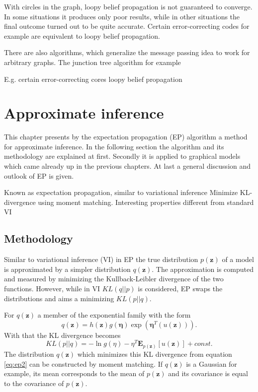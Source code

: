 \documentclass{sigkdd}
\begin{document}
With circles in the graph, loopy belief propagation is not guaranteed to converge. In some situations it produces only poor results, while in other situations the final outcome turned out to be quite accurate. Certain error-correcting codes for example are equivalent to loopy belief propagation.

There are also algorithms, which generalize the message passing idea to work for arbitrary graphs. The junction tree algorithm for example 

E.g. certain error-correcting cores
loopy belief propagation

\section{Approximate inference}
This chapter presents by the expectation propagation (EP) algorithm a method for approximate inference. In the following section the algorithm and its methodology are explained at first. Secondly it is applied to graphical models which came already up in the previous chapters. At last a general discussion and outlook of EP is given.

Known as expectation propagation, similar to variational inference
Minimize KL-divergence using moment matching.
Interesting properties different from standard VI
\subsection{Methodology}
Similar to variational inference (VI) in EP the true distribution $p(\mathbf{z})$ of a model is approximated by a simpler distribution $q(\mathbf{z})$. The approximation is computed and measured by minimizing the Kullback-Leibler divergence of the two functions. However, while in VI $KL(q||p)$ is considered, EP swaps the distributions and aims a minimizing $KL(p||q)$.

For $q(\mathbf{z})$ a member of the exponential family with the form
\begin{equation}\label{eq:ep1}
q(\mathbf{z}) = h(\mathbf{z})g(\mathbf{\eta}) \exp(\mathbf{\eta}^T(u(\mathbf{z}))).
\end{equation}
With that the KL divergence becomes
\begin{equation}\label{eq:ep2}
KL(p||q)= - \ln g(\eta) - \eta^T \mathbf{E}_{p(\mathbf{z})} [u(\mathbf{z})] + const.
\end{equation}
The distribution $q(\mathbf{z})$ which minimizes this KL divergence from equation \ref{eq:ep2} can be constructed by moment matching. If $q(\mathbf{z})$ is a Gaussian for example, its mean corresponds to the mean of $p(\mathbf{z})$ and its covariance is equal to the covariance of $p(\mathbf{z})$.
\end{document}
